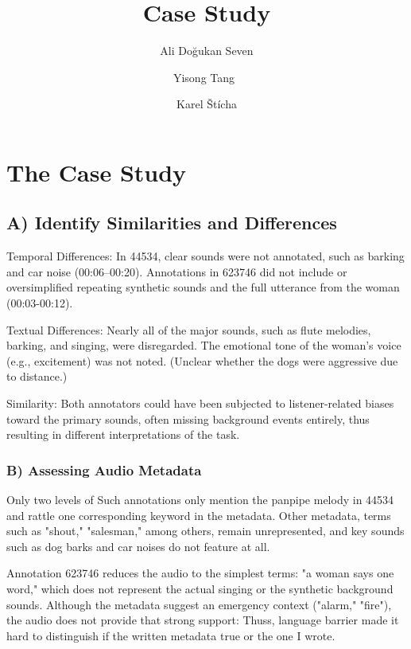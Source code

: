 \documentclass[runningheads]{llncs}
\begin{document}
%
\title{Case Study}
%
%
\author{Ali Doğukan Seven \and
Yisong Tang\ \and
Karel Štícha 
}
%
%
%
\maketitle              %
%
%
%
%
\section{The Case Study}
\subsection{ A) Identify Similarities and Differences}

Temporal Differences: In 44534, clear sounds were not annotated, such as barking and car noise (00:06–00:20). Annotations in 623746 did not include or oversimplified repeating synthetic sounds and the full utterance from the woman (00:03-00:12). 

Textual Differences: Nearly all of the major sounds, such as flute melodies, barking, and singing, were disregarded. The emotional tone of the woman's voice (e.g., excitement) was not noted. (Unclear whether the dogs were aggressive due to distance.) 

Similarity: Both annotators could have been subjected to listener-related biases toward the primary sounds, often missing background events entirely, thus resulting in different interpretations of the task.
\subsubsection{B) Assessing Audio Metadata} Only two levels of
Such annotations only mention the panpipe melody in 44534 and rattle one corresponding keyword in the metadata. Other metadata, terms such as "shout," "salesman," among others, remain unrepresented, and key sounds such as dog barks and car noises do not feature at all.

Annotation 623746 reduces the audio to the simplest terms: "a woman says one word," which does not represent the actual singing or the synthetic background sounds. Although the metadata suggest an emergency context ("alarm," "fire"), the audio does not provide that strong support: Thuss, language barrier made it hard to distinguish if the written metadata true or the one I wrote.
\end{document}
